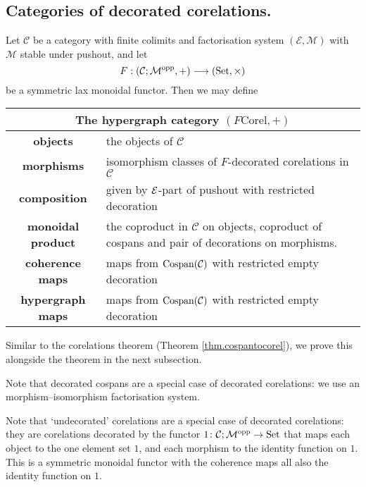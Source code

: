 \subsection{Categories of decorated corelations.}
\begin{theorem}
  Let $\mathcal C$ be a category with finite colimits and factorisation system
  $(\mathcal E, \mathcal M)$ with $\mathcal M$ stable under pushout, and let 
  \[
    F: (\mathcal C;\mathcal M^{\mathrm{opp}},+) \longrightarrow (\mathrm{Set}, \times)
  \]
  be a symmetric lax monoidal functor.  Then we may define 
  \begin{center}
    \begin{tabular}{| c | p{} |}
      \hline
      \multicolumn{2}{|c|}{The hypergraph category $(F\mathrm{Corel},+)$} \\
      \hline
      \textbf{objects} & the objects of $\mathcal C$ \\ 
      \textbf{morphisms} & isomorphism classes of $F$-decorated corelations in
      $\mathcal C$\\ 
      \textbf{composition} & given by $\mathcal E$-part of pushout with restricted
      decoration  \\
      \textbf{monoidal product} & the coproduct in $\mathcal C$ on objects, coproduct
      of cospans and pair of decorations on morphisms. \\
      \textbf{coherence maps} & maps from $\operatorname{{Cospan}}(\mathcal C)$ with restricted empty
      decoration \\
      \textbf{hypergraph maps} & maps from $\operatorname{{Cospan}}(\mathcal C)$ with restricted empty
      decoration \\
      \hline
    \end{tabular}
  \end{center}
\end{theorem}
Similar to the corelations theorem (Theorem \ref{thm.cospantocorel}), we prove
this alongside the theorem in the next subsection.
\begin{example}
  Note that decorated cospans are a special case of decorated corelations: we
  use an morphism--isomorphism factorisation system.
\end{example}

\begin{example} \label{ex.undeccorel}
  Note that `undecorated' corelations are a special case of decorated
  corelations: they are corelations decorated by the functor $1{\colon} \mathcal C;\mathcal
  M^{\mathrm{opp}} \to \mathrm{Set}$ that maps each object to the one element set $1$, and each
  morphism to the identity function on $1$. This is a symmetric monoidal functor
  with the coherence maps all also the identity function on $1$.
\end{example}

